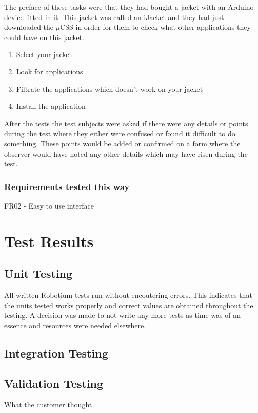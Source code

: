 		The preface of these tasks were that they had bought a jacket with an Arduino device fitted in it. This jacket was called an iJacket and they had just downloaded the $\mu$CSS in order for them to check what other applications they could have on this jacket.

		\begin{enumerate}
		 \item Select your jacket
		 \item Look for applications
		 \item Filtrate the applications which doesn't work on your jacket
		 \item Install the application
		\end{enumerate}

		After the tests the test subjects were asked if there were any details or points during the test where they either were confused or found it difficult to do something. These points would be added or confirmed on a form where the observer would have noted any other details which may have risen during the test.

			\subsubsection{Requirements tested this way}
			FR02 - Easy to use interface

	\section{Test Results}
		\subsection{Unit Testing}
		All written Robotium tests run without encoutering errors. This indicates that the units tested works properly and correct values are obtained throughout the testing. A decision was made to not write any more tests as time was of an essence and resources were needed elsewhere. 

		\subsection{Integration Testing}

		\subsection{Validation Testing}
		What the customer thought 

